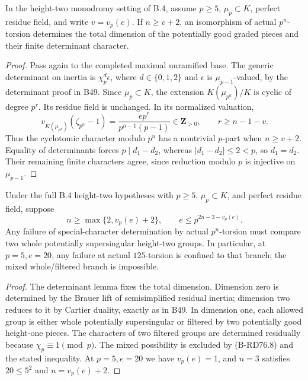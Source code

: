 \begin{lemma}
\label{lem:B-RD76-determinant}
In the height-two monodromy setting of B.4, assume \(p\ge5\),
\(\mu_p\subset K\), perfect residue field, and write
\(v=v_p(e)\). If \(n\ge v+2\), an isomorphism of actual
\(p^n\)-torsion determines the total dimension of the potentially
good graded pieces and their finite determinant character.
\end{lemma}
\begin{proof}
Pass again to the completed maximal unramified base. The generic
determinant on inertia is \(\chi_p^d\epsilon\), where
\(d\in\{0,1,2\}\) and \(\epsilon\) is
\(\mu_{p-1}\)-valued, by the determinant proof in B49.
Since \(\mu_p\subset K\), the extension \(K(\mu_{p^n})/K\)
is cyclic of degree \(p^r\). Its residue field is unchanged.
In its normalized valuation,
\[
 v_{K(\mu_{p^n})}(\zeta_{p^n}-1)
     =\frac{ep^r}{p^{n-1}(p-1)}\in\mathbf Z_{>0},
 \qquad r\ge n-1-v.                                \tag{B-RD76.9}
\]
Thus the cyclotomic character modulo \(p^n\) has a nontrivial
\(p\)-part when \(n\ge v+2\). Equality of determinants forces
\(p\mid d_1-d_2\), whereas \(|d_1-d_2|\le2<p\), so
\(d_1=d_2\). Their remaining finite characters agree, since
reduction modulo \(p\) is injective on \(\mu_{p-1}\).
\end{proof}

\begin{corollary}[The remaining branch at \(p=5,e=20\)]
\label{cor:B-RD76}
Under the full B.4 height-two hypotheses with \(p\ge5\),
\(\mu_p\subset K\), and perfect residue field, suppose
\[
 n\ge\max\{2,v_p(e)+2\},\qquad
 e\le p^{2n-3-v_p(e)}.                              \tag{B-RD76.10}
\]
Any failure of special-character determination by actual
\(p^n\)-torsion must compare two whole potentially
supersingular height-two groups. In particular, at \(p=5,e=20\),
any failure at actual \(125\)-torsion is confined to that branch;
the mixed whole/filtered branch is impossible.
\end{corollary}
\begin{proof}
The determinant lemma fixes the total dimension. Dimension zero
is determined by the Brauer lift of semisimplified residual
inertia; dimension two reduces to it by Cartier duality, exactly
as in B49. In dimension one, each allowed group is either whole
potentially supersingular or filtered by two potentially good
height-one pieces. The characters of two filtered groups are
determined residually because \(\chi_p\equiv1\pmod p\).
The mixed possibility is excluded by (B-RD76.8) and the stated
inequality. At \(p=5,e=20\) we have \(v_p(e)=1\), and
\(n=3\) satisfies \(20\le5^2\) and \(n=v_p(e)+2\).
\end{proof}

